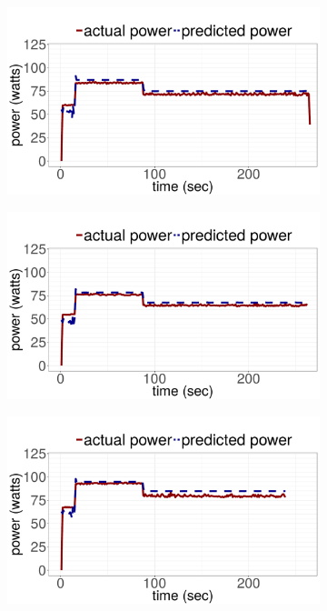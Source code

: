 \begin{figure}[p]
	\centering
	\begin{subfigure}[b]{.6\textwidth}
  	\includegraphics[width=\textwidth]{power_aware_job_scheduling/figures/predict_blackscholes_catalyst45}
  \end{subfigure}%
\qquad
	\begin{subfigure}[b]{.6\textwidth}
  	\includegraphics[width=\textwidth]{power_aware_job_scheduling/figures/predict_blackscholes_catalyst79}
	\end{subfigure}%
\qquad
	\begin{subfigure}[b]{.6\textwidth}
	  \includegraphics[width=\textwidth]{power_aware_job_scheduling/figures/predict_blackscholes_catalyst239}
	\end{subfigure}%


\end{figure}
